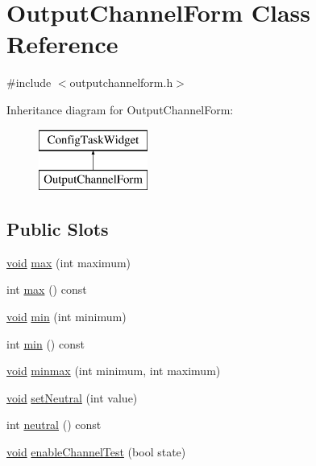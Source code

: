 \hypertarget{class_output_channel_form}{\section{\-Output\-Channel\-Form \-Class \-Reference}
\label{class_output_channel_form}
}


{\ttfamily \#include $<$outputchannelform.\-h$>$}

\-Inheritance diagram for \-Output\-Channel\-Form\-:\begin{figure}[H]
\begin{center}
\leavevmode
\includegraphics[height=2.000000cm]{class_output_channel_form}
\end{center}
\end{figure}
\subsection*{\-Public \-Slots}
\begin{DoxyCompactItemize}
\item 
\hyperlink{group___u_a_v_objects_plugin_ga444cf2ff3f0ecbe028adce838d373f5c}{void} \hyperlink{group___config_plugin_gadeee570b83855701e61945279673cd59}{max} (int maximum)
\item 
int \hyperlink{group___config_plugin_gac5e9e5be40f804ee632232a3e980ee0d}{max} () const 
\item 
\hyperlink{group___u_a_v_objects_plugin_ga444cf2ff3f0ecbe028adce838d373f5c}{void} \hyperlink{group___config_plugin_gac5d132282f1a4c2233999a1041995124}{min} (int minimum)
\item 
int \hyperlink{group___config_plugin_ga2086e4a8bc1572b98114b0272313ed2a}{min} () const 
\item 
\hyperlink{group___u_a_v_objects_plugin_ga444cf2ff3f0ecbe028adce838d373f5c}{void} \hyperlink{group___config_plugin_gad231eb8bdcfa798ec5246049fdd07ae4}{minmax} (int minimum, int maximum)
\item 
\hyperlink{group___u_a_v_objects_plugin_ga444cf2ff3f0ecbe028adce838d373f5c}{void} \hyperlink{group___config_plugin_ga46c4da3a30cc25c1178b9f9a125c8660}{set\-Neutral} (int value)
\item 
int \hyperlink{group___config_plugin_ga7ec2288bf27bf15dfb962c5e965d008e}{neutral} () const 
\item 
\hyperlink{group___u_a_v_objects_plugin_ga444cf2ff3f0ecbe028adce838d373f5c}{void} \hyperlink{group___config_plugin_ga306e95f301ee75290ea828d4c7e04a60}{enable\-Channel\-Test} (bool state)
\end{DoxyCompactItemize}
